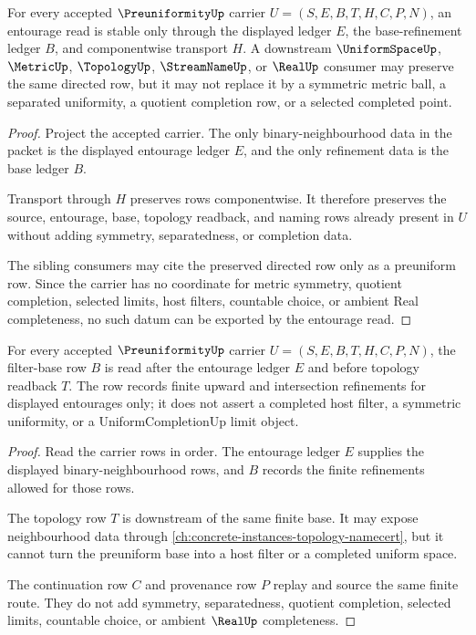 \begin{theorem}
\label{thm:preuniformity-entourage-stability}
For every accepted $\PreuniformityUp$ carrier $U=(S,E,B,T,H,C,P,N)$, an entourage read is stable only through the displayed ledger $E$, the base-refinement ledger $B$, and componentwise transport $H$. A downstream $\UniformSpaceUp$, $\MetricUp$, $\TopologyUp$, $\StreamNameUp$, or $\RealUp$ consumer may preserve the same directed row, but it may not replace it by a symmetric metric ball, a separated uniformity, a quotient completion row, or a selected completed point.
\end{theorem}
\begin{proof}
Project the accepted carrier. The only binary-neighbourhood data in the packet is the displayed entourage ledger $E$, and the only refinement data is the base ledger $B$.

Transport through $H$ preserves rows componentwise. It therefore preserves the source, entourage, base, topology readback, and naming rows already present in $U$ without adding symmetry, separatedness, or completion data.

The sibling consumers may cite the preserved directed row only as a preuniform row. Since the carrier has no coordinate for metric symmetry, quotient completion, selected limits, host filters, countable choice, or ambient Real completeness, no such datum can be exported by the entourage read.
\end{proof}

\begin{theorem}
\label{thm:preuniformity-filter-base}
For every accepted $\PreuniformityUp$ carrier $U=(S,E,B,T,H,C,P,N)$, the filter-base row $B$ is read after the entourage ledger $E$ and before topology readback $T$. The row records finite upward and intersection refinements for displayed entourages only; it does not assert a completed host filter, a symmetric uniformity, or a UniformCompletionUp limit object.
\end{theorem}
\begin{proof}
Read the carrier rows in order. The entourage ledger $E$ supplies the displayed binary-neighbourhood rows, and $B$ records the finite refinements allowed for those rows.

The topology row $T$ is downstream of the same finite base. It may expose neighbourhood data through \autoref{ch:concrete-instances-topology-namecert}, but it cannot turn the preuniform base into a host filter or a completed uniform space.

The continuation row $C$ and provenance row $P$ replay and source the same finite route. They do not add symmetry, separatedness, quotient completion, selected limits, countable choice, or ambient $\RealUp$ completeness.
\end{proof}

